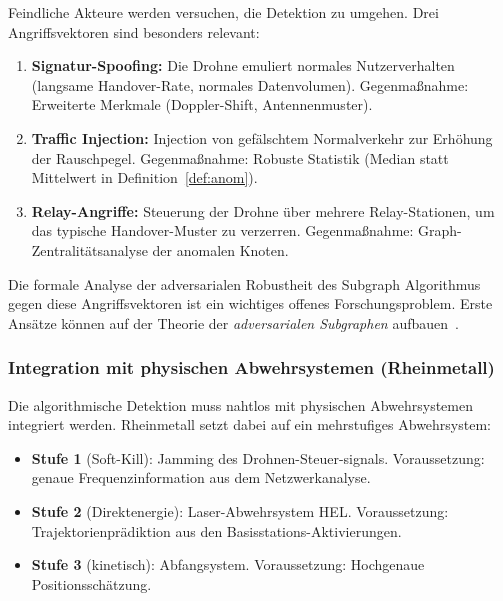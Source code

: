 ﻿\documentclass[a4paper,12pt]{article}
\theoremstyle{definition}
\begin{document}
Feindliche Akteure werden versuchen, die Detektion zu umgehen. Drei
Angriffsvektoren sind besonders relevant:

\begin{enumerate}
    \item \textbf{Signatur-Spoofing:} Die Drohne emuliert normales
          Nutzerverhalten (langsame Handover-Rate, normales Datenvolumen).
          Gegenma\ss{}nahme: Erweiterte Merkmale (Doppler-Shift, Antennenmuster).

    \item \textbf{Traffic Injection:} Injection von gef\"alschtem Normalverkehr
          zur Erh\"ohung der Rauschpegel. Gegenma\ss{}nahme: Robuste Statistik
          (Median statt Mittelwert in Definition~\ref{def:anom}).

    \item \textbf{Relay-Angriffe:} Steuerung der Drohne \"uber mehrere
          Relay-Stationen, um das typische Handover-Muster zu verzerren.
          Gegenma\ss{}nahme: Graph-Zentralit\"atsanalyse der anomalen Knoten.
\end{enumerate}

Die formale Analyse der adversarialen Robustheit des Subgraph Algorithmus
gegen diese Angriffsvektoren ist ein wichtiges offenes Forschungsproblem.
Erste Ans\"atze k\"onnen auf der Theorie der \emph{adversarialen Subgraphen}
aufbauen~\cite{goodfellow2018}.

\subsubsection{Integration mit physischen Abwehrsystemen (Rheinmetall)}

Die algorithmische Detektion muss nahtlos mit physischen Abwehrsystemen
integriert werden. Rheinmetall setzt dabei auf ein mehrstufiges Abwehrsystem:

\begin{itemize}
    \item \textbf{Stufe 1} (Soft-Kill): Jam\-ming des Drohnen-Steuer-\-signals.
          Voraussetzung: genaue Frequenzinformation aus dem Netzwerkanalyse.
    \item \textbf{Stufe 2} (Direktenergie): Laser-Abwehrsystem HEL.
          Voraussetzung: Trajektorienpr\"adiktion aus den Basisstations-Aktivierungen.
    \item \textbf{Stufe 3} (kinetisch): Abfangsystem.
          Voraussetzung: Hochgenaue Positionssch\"atzung.
\end{itemize}
\end{document}
